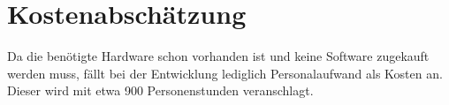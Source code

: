
\section{Kostenabschätzung}

Da die benötigte Hardware schon vorhanden ist und keine Software zugekauft werden muss, fällt bei der Entwicklung lediglich Personalaufwand als Kosten an. Dieser wird mit etwa 900 Personenstunden veranschlagt.



